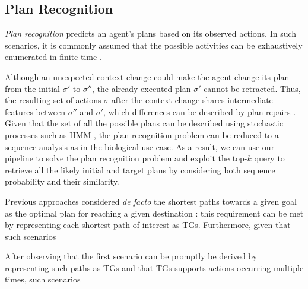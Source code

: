 
\subsection{Plan Recognition}
\textit{Plan recognition} predicts an agent's plans based on its observed actions. In such scenarios, it is commonly assumed that the possible activities can be exhaustively enumerated in finite time \cite{RamirezG09}. 

Although  an unexpected context change could make the agent change its plan from the initial $\sigma'$ to $\sigma''$, the already-executed plan $\sigma'$ cannot be retracted. Thus, the  resulting set of actions ${\sigma}$ after the context change  shares intermediate features between $\sigma''$ and $\sigma'$, which differences can be described by plan repairs \cite{FoxGLS06}. Given that the set of all the possible plans can be described using stochastic processes such as HMM \cite{LI2020101974}, the plan recognition problem can be reduced to a sequence analysis as in the biological use case. As a result, we can use our pipeline to solve the plan recognition problem and exploit the top-$k$ query to retrieve all the likely initial and target plans by considering both sequence probability and their similarity.


Previous approaches considered \textit{de facto} the shortest paths towards a given goal as the optimal plan for reaching a given destination  \cite{RamirezG10}: this requirement can be met by representing each shortest path of interest as TGs. Furthermore, given that such scenarios 


 After observing that the first scenario can be promptly be derived by representing such paths as TGs and that TGs supports actions occurring multiple times, such scenarios
